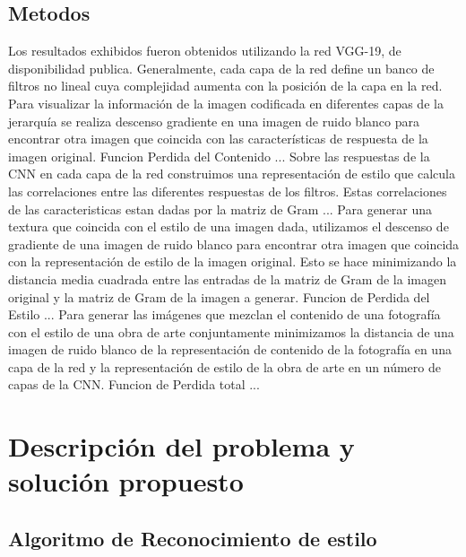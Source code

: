 \documentclass[a4paper,11pt,spanish]{book}
\begin{document}
    \section{Metodos}
      Los resultados exhibidos fueron obtenidos utilizando la red VGG-19, de disponibilidad publica.
      Generalmente, cada capa de la red define un banco de filtros no lineal cuya complejidad aumenta con la posición de la capa en la red.
      Para visualizar la información de la imagen codificada en diferentes capas de la jerarquía se realiza descenso gradiente en una imagen de ruido blanco 
      para encontrar otra imagen que coincida con las características de respuesta de la imagen original.
      Funcion Perdida del Contenido ...
      Sobre las respuestas de la CNN en cada capa de la red construimos una representación de estilo que calcula las correlaciones entre las diferentes respuestas de los filtros.
      Estas correlaciones de las caracteristicas estan dadas por la matriz de Gram ...
      Para generar una textura que coincida con el estilo de una imagen dada, utilizamos el descenso de gradiente de una imagen de ruido blanco para encontrar otra imagen que coincida 
      con la representación de estilo de la imagen original. Esto se hace minimizando la distancia media cuadrada entre las entradas de la matriz de Gram de la imagen 
      original y la matriz de Gram de la imagen a generar.
      Funcion de Perdida del Estilo ...
      Para generar las imágenes que mezclan el contenido de una fotografía con el estilo de una obra de arte conjuntamente minimizamos la distancia de una imagen de ruido blanco 
      de la representación de contenido de la fotografía en una capa de la red y la representación de estilo de la obra de arte en un número de capas de la CNN.
      Funcion de Perdida total ...
    
     
\chapter{Descripción del problema y solución propuesto}
  \section{Algoritmo de Reconocimiento de estilo}
\end{document}
